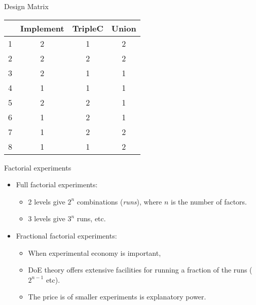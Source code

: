 \documentclass[english,handout,aspectratio=169]{ifislide}
\begin{document}
\begin{frame}{Design Matrix}

\begin{table}[ht]
\begin{center}
\begin{tabular}{r|ccc}
  \hline
 & Implement & TripleC & Union \\ 
  \hline
1 & 2 & 1 & 2 \\ 
  2 & 2 & 2 & 2 \\ 
  3 & 2 & 1 & 1 \\ 
  4 & 1 & 1 & 1 \\ 
  5 & 2 & 2 & 1 \\ 
  6 & 1 & 2 & 1 \\ 
  7 & 1 & 2 & 2 \\ 
  8 & 1 & 1 & 2 \\ 
   \hline
\end{tabular}
\end{center}
\end{table}


\end{frame}

\begin{frame}{Factorial experiments}

  \begin{itemize}
  \item Full factorial experiments:
    \begin{itemize}
    \item 2 levels give $2^n$ combinations (\emph{runs}), where $n$ is
      the number of factors.
    \item 3 levels give $3^n$ runs, etc.
    \end{itemize}
  \item Fractional factorial experiments:

    \begin{itemize}
    \item When experimental economy is important,
    \item DoE theory offers extensive facilities for running a
      fraction of the runs ($2^{n-1}$ etc).
    \item The price is of smaller experiments is explanatory power.
    \end{itemize}
  \end{itemize}
\end{frame}
\end{document}
